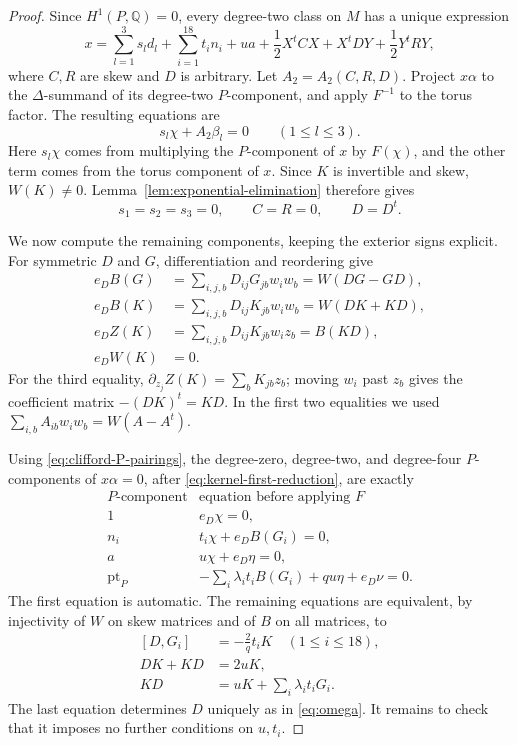 \documentclass[11pt]{article}
\numberwithin{equation}{section}
\theoremstyle{definition}
\theoremstyle{remark}
\begin{document}
\begin{proof}
Since $H^1(P,\mathbb Q)=0$, every degree-two class on $M$ has a unique
expression
\[
 x=\sum_{l=1}^3s_ld_l+\sum_{i=1}^{18}t_in_i+ua
      +\frac12X^tCX+X^tDY+\frac12Y^tRY,
\]
where $C,R$ are skew and $D$ is arbitrary.  Let
$A_2=A_2(C,R,D)$.
Project $x\alpha$ to the $\Delta$-summand of its degree-two
$P$-component, and apply $F^{-1}$ to the torus factor.
The resulting equations are
\[
 s_l\chi+A_2\beta_l=0\qquad(1\le l\le3).
\]
Here $s_l\chi$ comes from multiplying the $P$-component of $x$ by
$F(\chi)$, and the other term comes from the torus component of $x$.
Since $K$ is invertible and skew, $W(K)\ne0$.
Lemma~\ref{lem:exponential-elimination} therefore gives
\begin{equation}\label{eq:kernel-first-reduction}
 s_1=s_2=s_3=0,\qquad C=R=0,\qquad D=D^t.
\end{equation}

We now compute the remaining components, keeping the exterior signs
explicit.  For symmetric $D$ and $G$, differentiation and reordering
give
\[
 \begin{aligned}
 e_DB(G)&=\sum_{i,j,b}D_{ij}G_{jb}w_iw_b
                 =W(DG-GD),\\
 e_DB(K)&=\sum_{i,j,b}D_{ij}K_{jb}w_iw_b
                 =W(DK+KD),\\
 e_DZ(K)&=\sum_{i,j,b}D_{ij}K_{jb}w_iz_b
                 =B(KD),\\
 e_DW(K)&=0.
 \end{aligned}
\]
For the third equality, $\partial_{z_j}Z(K)=\sum_bK_{jb}z_b$;
moving $w_i$ past $z_b$ gives the coefficient matrix
$-(DK)^t=KD$.  In the first two equalities we used
$\sum_{i,b}A_{ib}w_iw_b=W(A-A^t)$.

Using \eqref{eq:clifford-P-pairings}, the degree-zero, degree-two, and
degree-four $P$-components of $x\alpha=0$, after
\eqref{eq:kernel-first-reduction}, are exactly
\[
 \begin{array}{c|l}
 \text{$P$-component}&\text{equation before applying $F$}\\ \hline
 1&e_D\chi=0,\\
 n_i&t_i\chi+e_DB(G_i)=0,\\
 a&u\chi+e_D\eta=0,\\
 \operatorname{pt}_P&-\displaystyle\sum_i\lambda_it_iB(G_i)+qu\eta+e_D\nu=0.
 \end{array}
\]
The first equation is automatic.  The remaining equations are
equivalent, by injectivity of $W$ on skew matrices and of $B$ on all
matrices, to
\begin{equation}\label{eq:kernel-matrix-equations}
 \begin{aligned}
 [D,G_i]&=-\frac2q t_iK\quad(1\le i\le18),\\
 DK+KD&=2uK,\\
 KD&=uK+\sum_i\lambda_it_iG_i.
 \end{aligned}
\end{equation}
The last equation determines $D$ uniquely as in \eqref{eq:omega}.
It remains to check that it imposes no further conditions on $u,t_i$.


\end{proof}
\end{document}
